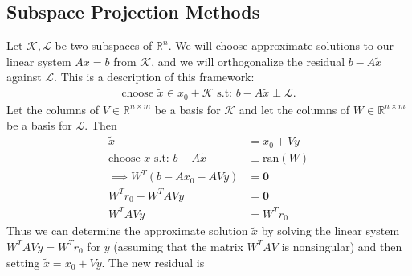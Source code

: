 \documentclass[]{article}
\theoremstyle{definition}
\begin{document}
    \subsection{Subspace Projection Methods}\label{sec:Subspace_Projection_Methods}
        Let $\mathcal K, \mathcal L$ be two subspaces of $\mathbb{R}^n$. We will choose approximate solutions to our linear system $Ax=b$ from $\mathcal{K}$, and we will orthogonalize the residual $b-A \tilde{x}$ against $\mathcal{L}$.
        This is a description of this framework: 
        \begin{align}
            \text{choose }\tilde{x} \in x_0 + \mathcal{K} \text{ s.t: } b - A\tilde{x} \perp \mathcal{L} .
        \end{align}
        Let the columns of $V \in \mathbb{R}^{n \times m}$ be a basis for $\mathcal{K}$ and let the columns of $W \in \mathbb{R}^{n \times m}$ be a basis for $\mathcal{L}$.  Then
        \begin{align}\label{eqn.Orthogonalitycond}
            \tilde{x} &= x_0 + Vy
            \\
            \text{choose } x \text{ s.t: } b - A\tilde{x}  &\perp \text{ran}(W)
            \\
            \implies W^T(b - Ax_0 - AVy) &= \mathbf{0}
            \\
            W^Tr_0 - W^TAVy&= \mathbf{0}
            \\
            W^TAVy &= W^Tr_0
        \end{align}
        Thus we can determine the approximate solution $\tilde{x}$ by solving the linear system $W^T A V y = W^T r_0$ for $y$ (assuming that the matrix $W^T A V$ is nonsingular) and then setting $\tilde{x} = x_0 + V y$.  The new residual is
\end{document}
